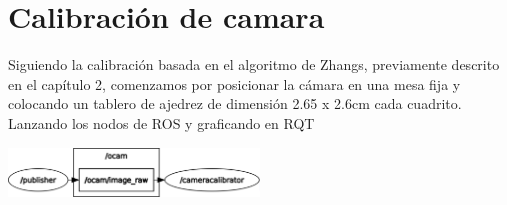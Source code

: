 
\section{Calibración de camara}
Siguiendo la calibración basada en el algoritmo de Zhangs, previamente descrito en el capítulo 2,
comenzamos por posicionar la cámara en una mesa fija y colocando un tablero de ajedrez de dimensión
2.65 x 2.6cm cada cuadrito.\\ Lanzando los nodos de ROS y graficando en RQT
\begin{center}
	\includegraphics[width=0.5\textwidth]{Contenido/Cuerpo/Capitulo4/Fig11.eps}
	\label{Fig1}
\end{center}

